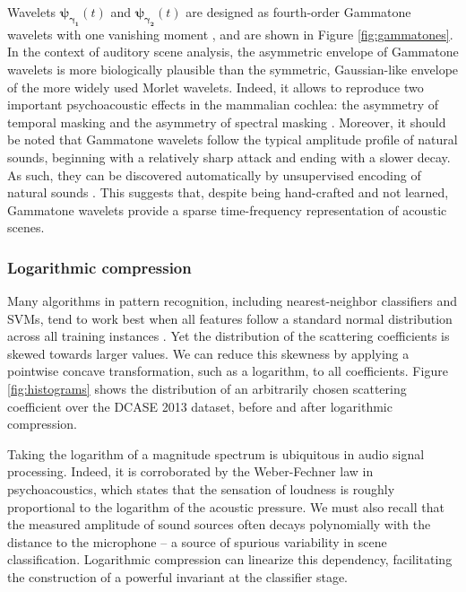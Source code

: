 Wavelets $\boldsymbol{\psi_{\gamma_1}}(t)$ and $\boldsymbol{\psi_{\gamma_2}}(t)$ are designed as fourth-order Gammatone
wavelets with one vanishing moment \cite{Venkitaraman2014}, and are shown in Figure \ref{fig:gammatones}.
In the context of auditory scene analysis, the asymmetric envelope of Gammatone wavelets is more biologically plausible than the symmetric, Gaussian-like envelope of the more widely used Morlet wavelets.
Indeed, it allows to reproduce two important psychoacoustic effects in the mammalian cochlea: the asymmetry of temporal masking and the asymmetry of spectral masking  \cite{Fastl2007}.
Moreover, it should be noted that Gammatone wavelets follow the typical amplitude profile of natural sounds, beginning with a relatively sharp attack and ending with a slower decay.
As such, they can be discovered automatically by unsupervised encoding of natural sounds \cite{Smith2006}.
This suggests that, despite being hand-crafted and not learned, Gammatone wavelets provide a sparse time-frequency representation of acoustic scenes.

\subsubsection{Logarithmic compression}
\label{sec:ch6_LogComp}

Many algorithms in pattern recognition, including nearest-neighbor classifiers and SVMs, tend to work best when all features follow a standard normal distribution across all training instances \cite{Hsu2003}.
Yet the distribution of the scattering coefficients is skewed towards larger values. We can reduce this skewness by applying a pointwise concave transformation, such as a logarithm, to all coefficients.
Figure \ref{fig:histograms} shows the distribution of an arbitrarily chosen scattering coefficient over the DCASE 2013 dataset, before and after logarithmic compression.



Taking the logarithm of a magnitude spectrum is ubiquitous in audio signal processing.
Indeed, it is corroborated by the Weber-Fechner law in psychoacoustics, which states that the sensation of loudness is roughly proportional to the logarithm of the acoustic pressure. 
We must also recall that the measured amplitude of sound sources often decays polynomially with the distance to the microphone -- a source of spurious variability in scene classification.
Logarithmic compression can linearize this dependency, facilitating the construction of a powerful invariant at the classifier stage.

